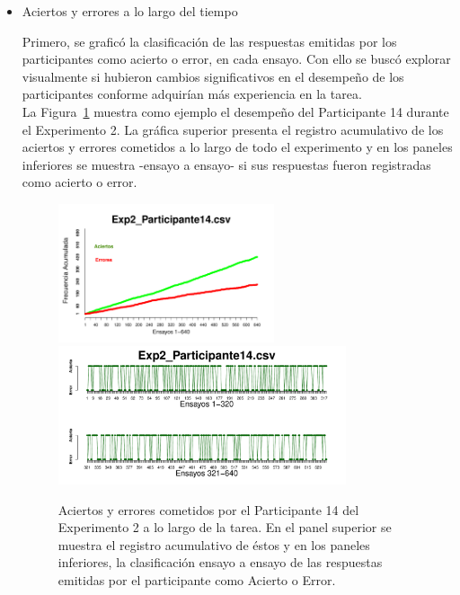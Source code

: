 \begin{itemize}
	\item Aciertos y errores a lo largo del tiempo

Primero, se graficó la clasificación de las respuestas emitidas por los participantes como acierto o error, en cada ensayo. Con ello se buscó explorar visualmente si hubieron cambios significativos en el desempeño de los participantes conforme adquirían más experiencia en la tarea.\\

La Figura~\ref{fig:Success_E2_P14} muestra como ejemplo el desempeño del Participante 14 durante el Experimento 2. La gráfica superior presenta el registro acumulativo de los aciertos y errores cometidos a lo largo de todo el experimento y en los paneles inferiores se muestra -ensayo a ensayo- si sus respuestas fueron registradas como acierto o error.\\

\begin{figure}[th]
\centering
\includegraphics[width=0.60\textwidth]{Figures/SuccessCumulative_Exp2_P14} \\
\includegraphics[width=0.80\textwidth]{Figures/Success_Exp2_P14}
\caption[Explorando datos individuales (ejemplo): Aciertos y errores cometidos en cada ensayo]{Aciertos y errores cometidos por el Participante 14 del Experimento 2 a lo largo de la tarea. En el panel superior se muestra el registro acumulativo de éstos y en los paneles inferiores, la clasificación ensayo a ensayo de las respuestas emitidas por el participante como Acierto o Error.}
\label{fig:Success_E2_P14}
\end{figure}


\end{itemize}
